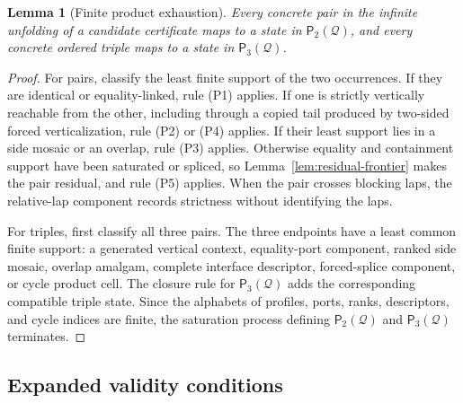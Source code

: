 \documentclass[11pt]{article}
\newtheorem{lemma}[theorem]{Lemma}
\newcommand{\Q}{\mathcal Q}
\newcommand{\Pairs}{\mathsf P_2}
\newcommand{\Triples}{\mathsf P_3}
\begin{document}
\begin{lemma}[Finite product exhaustion]\label{lem:product-exhaustion}
Every concrete pair in the infinite unfolding of a candidate certificate maps to a state in $\Pairs(\Q)$, and every concrete ordered triple maps to a state in $\Triples(\Q)$.
\end{lemma}

\begin{proof}
For pairs, classify the least finite support of the two occurrences.  If they are identical or equality-linked, rule (P1) applies.  If one is strictly vertically reachable from the other, including through a copied tail produced by two-sided forced verticalization, rule (P2) or (P4) applies.  If their least support lies in a side mosaic or an overlap, rule (P3) applies.  Otherwise equality and containment support have been saturated or spliced, so Lemma~\ref{lem:residual-frontier} makes the pair residual, and rule (P5) applies.  When the pair crosses blocking laps, the relative-lap component records strictness without identifying the laps.

For triples, first classify all three pairs.  The three endpoints have a least common finite support: a generated vertical context, equality-port component, ranked side mosaic, overlap amalgam, complete interface descriptor, forced-splice component, or cycle product cell.  The closure rule for $\Triples(\Q)$ adds the corresponding compatible triple state.  Since the alphabets of profiles, ports, ranks, descriptors, and cycle indices are finite, the saturation process defining $\Pairs(\Q)$ and $\Triples(\Q)$ terminates.
\end{proof}

\subsection{Expanded validity conditions}
\end{document}
